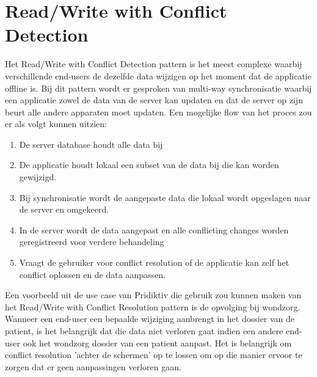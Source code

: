 \section{Read/Write with Conflict Detection}
Het Read/Write with Conflict Detection pattern is het meest complexe waarbij verschillende end-users de dezelfde data wijzigen op het moment dat de applicatie offline is. Bij dit pattern wordt er gesproken van multi-way synchronisatie waarbij een applicatie zowel de data van de server kan updaten en dat de server op zijn beurt alle andere apparaten moet updaten. Een mogelijke flow van het proces zou er als volgt kunnen uitzien:
\begin{enumerate}
\item De server database houdt alle data bij
\item De applicatie houdt lokaal een subset van de data bij die kan worden gewijzigd.
\item Bij synchronisatie wordt de aangepaste data die lokaal wordt opgeslagen naar de server en omgekeerd.
\item In de server wordt de data aangepast en alle conflicting changes worden geregistreerd voor verdere behandeling
\item Vraagt de gebruiker voor conflict resolution of de applicatie kan zelf het conflict oplossen en de data aanpassen.
\end{enumerate}
Een voorbeeld uit de use case van Pridiktiv die gebruik zou kunnen maken van het Read/Write with Conflict Resolution pattern is de opvolging bij wondzorg. Wanneer een end-user een bepaalde wijziging aanbrengt in het dossier van de patient, is het belangrijk dat die data niet verloren gaat indien een andere end-user ook het wondzorg dossier van een patient aanpast. Het is belangrijk om conflict resolution 'achter de schermen' op te lossen om op die manier ervoor te zorgen dat er geen aanpassingen verloren gaan.
